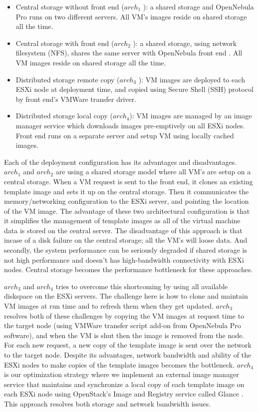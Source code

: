 \documentclass[acus]{JAC2003}
\begin{document}
\begin {itemize}
\item Central storage without front end (\textit{$arch_1$} ): a shared storage and OpenNebula Pro runs on two different servers. All VM's images reside on shared storage all the time. 
\item Central storage with front end (\textit{$arch_2$} ): a shared storage, using network filesystem (NFS), shares the same server with OpenNebula front end . All VM images reside on shared storage all the time.
\item Distributed storage remote copy (\textit{$arch_3$} ): VM images are deployed to each ESXi node at deployment time, and copied using Secure Shell (SSH) protocol by front end's VMWare transfer driver.
\item Distributed storage local copy (\textit{$arch_4$}): VM images are managed by an image manager service which downloads images pre-emptively on all ESXi nodes. Front end runs on a separate server and setup VM using locally cached images.
\end {itemize}

Each of the deployment configuration has its advantages and disadvantages. \textit{$arch_1$} and \textit{$arch_2$} are using a shared storage model where all VM's are setup on a central storage. When a VM request is sent to the front end, it clones an existing template image and sets it up on the central storage. Then it communicates the memory/networking configuration to the ESXi server, and pointing the location of the VM image. The advantage of these two architectural configuration is that it simplifies the management of template images as all of the virtual machine data is stored on the central server. The disadvantage of this approach is that incase of a disk failure on the central storage; all the VM's will loose data. And secondly, the system performance can be seriously degraded if shared storage is not high performance and doesn't has high-bandwidth connectivity with ESXi nodes. Central storage becomes the performance bottleneck for these approaches.

\textit{$arch_3$} and \textit{$arch_4$} tries to overcome this shortcoming by using all available diskspace on the ESXi servers. The challenge here is how to clone and maintain VM images at run time and to refresh them when they get updated. \textit{$arch_3$} resolves both of these challenges by copying the VM images at request time to the target node (using VMWare transfer script add-on from OpenNebula Pro software), and when the VM is shut then the image is removed from the node. For each new request, a new copy of the template image is sent over the network to the target node. Despite its advantages, network bandwidth and ability of the ESXi nodes to make copies of the template images becomes the bottleneck. \textit{$arch_4$} is our optimization strategy where we implement an external image manager service that maintains and synchronize a local copy of each template image on each ESXi node using OpenStack's Image and Registry service called Glance \cite{openstack}. This approach resolves both storage and network bandwidth issues. 
\end{document}
